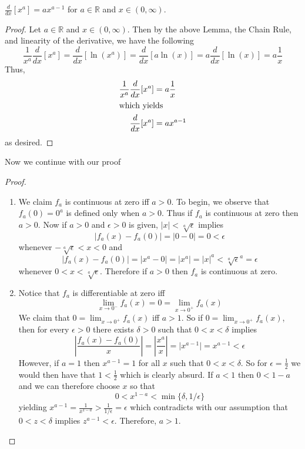 \begin{enumerate}
    \begin{corollary}
    \( \frac{d}{dx}[x^a] = ax^{a-1} \) for \( a \in \mathbb{R} \) and \( x \in (0, \infty) \).
    \end{corollary}
    
    \begin{proof}
    Let \( a \in \mathbb{R} \) and \( x \in (0, \infty) \). Then by the above Lemma, the Chain Rule, and linearity of the derivative, we have the following
    \[
    \frac{1}{x^a} \frac{d}{dx}[x^a] = \frac{d}{dx}[\ln(x^a)] = \frac{d}{dx}[a\ln(x)] = a \frac{d}{dx}[\ln(x)] = a \frac{1}{x}
    \]
    Thus, 
    \begin{align*}
        \frac{1}{x^a} \frac{d}{dx}[x^a] &= a \frac{1}{x} \\
        \intertext{which yields}
        \frac{d}{dx}[x^a] &= ax^{a-1}
    \end{align*}
    as desired.
    \end{proof}

    Now we continue with our proof
    \begin{proof}
    \begin{enumerate}
        \item We claim \( f_a \) is continuous at zero iff \( a > 0 \). To begin, we observe that \( f_a(0) = 0^a \) is defined only when \( a > 0 \). Thus if \( f_a \) is continuous at zero then \( a > 0 \). Now if \( a > 0 \) and \( \epsilon > 0 \) is given, \( \vert x \vert < \sqrt[a]{\epsilon} \) implies
        \[
        \vert f_a(x) - f_a(0) \vert = \vert 0 - 0 \vert = 0 < \epsilon
        \]
        whenever \( -\sqrt[a]{\epsilon} < x < 0 \) and
        \[
        \vert f_a(x) - f_a(0) \vert = \vert x^a - 0 \vert = \vert x^a \vert = \vert x \vert^a < \sqrt[a]{\epsilon}^a = \epsilon
        \]
        whenever \( 0 < x < \sqrt[a]{\epsilon} \). Therefore if \( a > 0 \) then \( f_a \) is continuous at zero.
        
        \item Notice that \( f_a \) is differentiable at zero iff
        \[
        \lim_{x \rightarrow 0^-} f_a(x) = 0 = \lim_{x \rightarrow 0^+} f_a(x)
        \]
        We claim that \( 0 = \lim_{x \rightarrow 0^+} f_a(x) \) iff \( a > 1 \). So if \( 0 = \lim_{x \rightarrow 0^+} f_a(x) \), then for every \( \epsilon > 0\) there exists \( \delta > 0 \) such that \( 0 < x < \delta \) implies
        \[
        \left| \frac{f_a(x)-f_a(0)}{x} \right| = \left| \frac{x^a}{x} \right| = \vert x^{a-1} \vert = x^{a-1} < \epsilon
        \]
        However, if \( a =1 \) then \( x^{a-1} = 1 \) for all \( x \) such that \( 0 < x < \delta \). So for \( \epsilon = \frac{1}{2} \) we would then have that \( 1 < \frac{1}{2} \) which is clearly absurd. If \( a < 1 \) then \( 0 < 1-a \) and we can therefore choose \( x \) so that \[
        0 < x^{1-a} < \min\{ \delta, 1/\epsilon \}
        \] 
        yielding \( x^{a-1} = \frac{1}{x^{1-a}} > \frac{1}{1/\epsilon} = \epsilon \) which contradicts with our assumption that \( 0 < z < \delta \) implies \( z^{a-1} < \epsilon \). Therefore, \( a > 1 \).
        

\end{enumerate}
\end{proof}
\end{enumerate}
